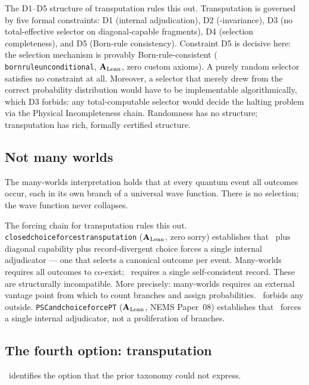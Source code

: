 \documentclass[11pt,openany]{book}
\theoremstyle{remark}
\newcommand{\GTE}{\text{GTE}}
\newcommand{\PSC}{\text{PSC}}
\newcommand{\lean}[1]{%
  \penalty-100
  \begingroup\def\_{\textunderscore\allowbreak}\texttt{#1}\endgroup}
\newcommand{\CatAL}{\ensuremath{\textbf{A}_{\rm Lean}}}
\begin{document}
The D1--D5 structure of transputation rules this out. Transputation is governed by
five formal constraints: D1 (internal adjudication), D2 (\PSC-invariance), D3 (no
total-effective selector on diagonal-capable fragments), D4 (selection completeness),
and D5 (Born-rule consistency). Constraint D5 is decisive here: the selection
mechanism is provably Born-rule-consistent (\lean{born\_rule\_unconditional}, \CatAL,
zero custom axioms). A purely random selector satisfies no constraint at all. Moreover,
a selector that merely drew from the correct probability distribution would have to
be implementable algorithmically, which D3 forbids: any total-computable selector
would decide the halting problem via the Physical Incompleteness chain.
Randomness has no structure; transputation has rich, formally certified structure.

\subsection*{Not many worlds}

The many-worlds interpretation holds that at every quantum event all outcomes occur,
each in its own branch of a universal wave function. There is no selection; the
wave function never collapses.

The forcing chain for transputation rules this out. \lean{closed\_choice\_forces\_transputation}
(\CatAL, zero sorry) establishes that \PSC\ plus diagonal capability plus
record-divergent choice forces a single internal adjudicator --- one that selects
a canonical outcome per event. Many-worlds requires all outcomes to co-exist;
\PSC\ requires a single self-consistent record. These are structurally incompatible.
More precisely: many-worlds requires an external vantage point from which to count
branches and assign probabilities. \PSC\ forbids any outside.
\lean{PSC\_and\_choice\_force\_PT} (\CatAL, NEMS Paper~08) establishes that \PSC\
forces a single internal adjudicator, not a proliferation of branches.

\subsection*{The fourth option: transputation}

\GTE\ identifies the option that the prior taxonomy could not express.
\end{document}
